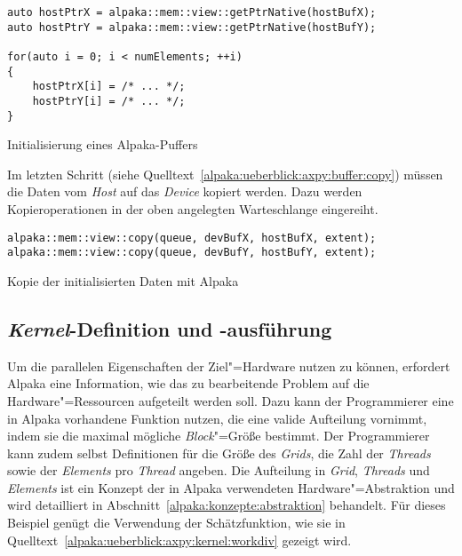 \begin{code}
    \begin{verbatim}
auto hostPtrX = alpaka::mem::view::getPtrNative(hostBufX);
auto hostPtrY = alpaka::mem::view::getPtrNative(hostBufY);

for(auto i = 0; i < numElements; ++i)
{
    hostPtrX[i] = /* ... */;
    hostPtrY[i] = /* ... */;
}
    \end{verbatim}
    \caption{Initialisierung eines Alpaka-Puffers}
    \label{alpaka:ueberblick:axpy:buffer:init}
\end{code}
\vspace{4mm}
Im letzten Schritt (siehe Quelltext~\ref{alpaka:ueberblick:axpy:buffer:copy})
müssen die Daten vom \textit{Host} auf das \textit{Device} kopiert werden. Dazu
werden Kopieroperationen in der oben angelegten Warteschlange eingereiht.

\begin{code}
    \begin{verbatim}
alpaka::mem::view::copy(queue, devBufX, hostBufX, extent);
alpaka::mem::view::copy(queue, devBufY, hostBufY, extent);
    \end{verbatim}
    \caption{Kopie der initialisierten Daten mit Alpaka}
    \label{alpaka:ueberblick:axpy:buffer:copy}
\end{code}

\subsection{\textit{Kernel}-Definition und -ausführung}
\label{alpaka:ueberblick:axpy:kernel}

Um die parallelen Eigenschaften der Ziel"=Hardware nutzen zu können, erfordert
Alpaka eine Information, wie das zu bearbeitende Problem auf die
Hardware"=Ressourcen aufgeteilt werden soll. Dazu kann der Programmierer eine
in Alpaka vorhandene Funktion nutzen, die eine valide Aufteilung vornimmt,
indem sie die maximal mögliche \textit{Block}"=Größe bestimmt. Der Programmierer
kann zudem selbst Definitionen für die Größe des \textit{Grids}, die Zahl der
\textit{Threads} sowie der \textit{Elements} pro \textit{Thread} angeben. Die
Aufteilung in \textit{Grid}, \textit{Threads} und \textit{Elements} ist ein
Konzept der in Alpaka verwendeten Hardware"=Abstraktion und wird detailliert in
Abschnitt~\ref{alpaka:konzepte:abstraktion} behandelt. Für dieses Beispiel
genügt die Verwendung der Schätzfunktion, wie sie in
Quelltext~\ref{alpaka:ueberblick:axpy:kernel:workdiv} gezeigt wird.

